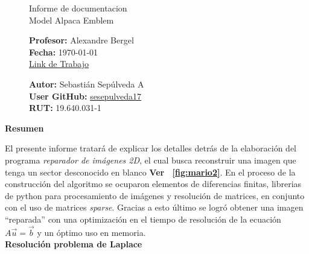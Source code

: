 \documentclass[letterpaper,10.7pt]{article}
\newcommand{\figref}[1]{\figurename~\ref{#1}}
\begin{document}
\pagestyle{style1}
\begin{figure}
\centering
\begin{minipage}[c]{0.8\textwidth}
\centering
\vspace{0.3cm}
{\large Informe de documentacion}
\vspace{0.1cm}\\
{\Large Model Alpaca Emblem}
\vspace{0.3cm}\\
  \begin{minipage}{0.48\textwidth}
    \centering
   	\textbf{Profesor:} Alexandre Bergel\\
	\textbf{Fecha:} \today\\
	\href{https://github.com/sesepulveda17/homeWork-cc3002/tree/master/t1}{Link de Trabajo}
   \end{minipage}\hfill
   \begin{minipage}{0.48\textwidth}
    \centering
   	\textbf{Autor:} Sebastián Sepúlveda A\\
	\textbf{User GitHub:} \href{https://github.com/sesepulveda17}{sesepulveda17}\\
	\textbf{RUT:} 19.640.031-1
   \end{minipage}
\end{minipage}
\end{figure}

\begin{center}
\textbf{{\large Resumen}}
\end{center}

El presente informe tratará de explicar los detalles detrás de la elaboración del programa \textit{reparador de imágenes 2D}, el cual busca reconstruir una imagen que tenga un sector desconocido en blanco \textbf{Ver \figref{fig:mario2}}. En el proceso de la construcción del algoritmo se ocuparon elementos de diferencias finitas, librerias de python para procesamiento de imágenes y resolución de matrices, en conjunto con el uso de matrices \textit{sparse}. Gracias a esto último se logró obtener una imagen ``reparada'' con una optimización en el tiempo de resolución de la ecuación $A \vec{u} = \vec{b}$ y un óptimo uso en memoria. \\


{\centering \textbf{{\Large Resolución problema de Laplace}}}\\
\end{document}
